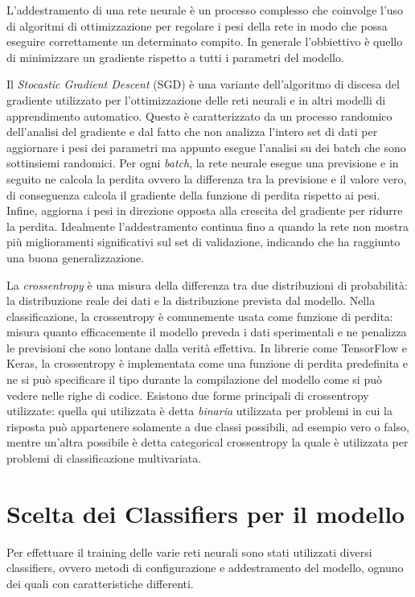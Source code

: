     L’addestramento di una rete neurale è un processo complesso che coinvolge l’uso di algoritmi di ottimizzazione per regolare i pesi della rete in modo che possa eseguire correttamente un determinato compito. In generale l’obbiettivo è quello di minimizzare un gradiente rispetto a tutti i parametri del modello.

    Il \textit{Stocastic Gradient Descent} (SGD) è una variante dell’algoritmo di discesa del gradiente utilizzato per l’ottimizzazione delle reti neurali e in altri modelli di apprendimento automatico. Questo è caratterizzato da un processo randomico dell’analisi del gradiente e dal fatto che non analizza l’intero set di dati per aggiornare i pesi dei parametri ma appunto esegue l’analisi su dei batch che sono sottinsiemi randomici. Per ogni \textit{batch}, la rete neurale esegue una previsione e in seguito ne calcola la perdita ovvero la differenza tra la previsione e il valore vero, di conseguenza calcola il gradiente della funzione di perdita rispetto ai pesi. Infine, aggiorna i pesi in direzione opposta alla crescita del gradiente per ridurre la perdita. Idealmente l’addestramento continua fino a quando la rete non mostra più miglioramenti significativi sul set di validazione, indicando che ha raggiunto una buona generalizzazione.

    La \textit{crossentropy} è una misura della differenza tra due distribuzioni di probabilità: la distribuzione reale dei dati e la distribuzione prevista dal modello. Nella classificazione, la crossentropy è comunemente usata come funzione di perdita: misura quanto efficacemente il modello preveda i dati sperimentali e ne penalizza le previsioni che sono lontane dalla verità effettiva. In librerie come TensorFlow e Keras, la crossentropy è implementata come una funzione di perdita predefinita e ne si può specificare il tipo durante la compilazione del modello come si può vedere nelle righe di codice. Esistono due forme principali di crossentropy utilizzate: quella qui utilizzata è detta \textit{binaria} utilizzata per problemi in cui la risposta può appartenere solamente a due classi possibili, ad esempio vero o falso, mentre un'altra possibile è detta categorical crossentropy la quale è utilizzata per problemi di classificazione multivariata.

\newpage

\section{Scelta dei Classifiers per il modello}
    Per effettuare il training delle varie reti neurali sono stati utilizzati diversi classifiers, ovvero metodi di configurazione e addestramento del modello, ognuno dei quali con caratteristiche differenti.


